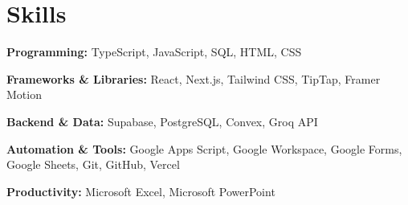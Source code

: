 \documentclass[a4paper,10pt]{article}
\newcommand{\skillrow}[2]{%
\noindent
\hangindent=0.6cm
\hangafter=1
\textbf{#1} #2\par%
}
\begin{document}
\section{Skills}

{\setlength{\parskip}{0pt}
\vspace{0.10cm}

\skillrow{Programming:}
{TypeScript, JavaScript, SQL, HTML, CSS}

\skillrow{Frameworks \& Libraries:}
{React, Next.js, Tailwind CSS, TipTap, Framer Motion}

\skillrow{Backend \& Data:}
{Supabase, PostgreSQL, Convex, Groq API}

\skillrow{Automation \& Tools:}
{Google Apps Script, Google Workspace, Google Forms, Google Sheets, Git, GitHub, Vercel}

\skillrow{Productivity:}
{Microsoft Excel, Microsoft PowerPoint}

}
\end{document}
